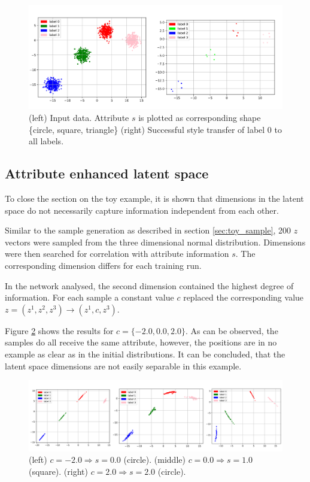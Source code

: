 \documentclass[final]{cvpr}
\begin{document}
\begin{figure}[t]
	\begin{center}
		\includegraphics[width=1.0\linewidth]{./figs/toy/with_style/combined_style_transfer.png}
	\end{center}
	\caption{(left) Input data. Attribute $s$ is plotted as corresponding shape \{circle, square, triangle\} (right) Successful style transfer of label 0 to all labels.}
	\label{fig:toy_style}
\end{figure}

\subsection{Attribute enhanced latent space}
To close the section on the toy example, it is shown that dimensions in the latent space do not necessarily capture information independent from each other. 

Similar to the sample generation as described in section \ref{sec:toy_sample}, 200 $z$ vectors were sampled from the three dimensional normal distribution.
Dimensions were then searched for correlation with attribute information $s$. The corresponding dimension differs for each training run. 

In the network analysed, the second dimension contained the highest degree of information. For each sample a constant value $c$ replaced the corresponding value $z = (z^1, z^2, z^3) \rightarrow (z^1, c, z^3)$.

Figure \ref{fig:latent} shows the results for $c = \{-2.0, 0.0, 2.0\}$. As can be observed, the samples do all receive the same attribute, however, the positions are in no example as clear as in the initial distributions.
It can be concluded, that the latent space dimensions are not easily separable in this example.

\begin{figure}[t]
	\begin{center}
		\includegraphics[width=1.0\linewidth]{./figs/toy/with_style/combined_reverse_sample.png}
	\end{center}
	\caption{(left) $c = -2.0 \Rightarrow s = 0.0$ (circle). (middle) $c = 0.0 \Rightarrow s = 1.0$ (square). (right) $c = 2.0 \Rightarrow s = 2.0$ (circle).}
	\label{fig:latent}
\end{figure}
\end{document}
